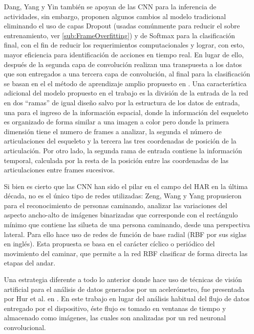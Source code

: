        Dang, Yang y Yin \cite{Dang2020Har3dSkelleton} también se apoyan de las CNN para la inferencia de actividades, sin embargo, proponen algunos cambios al modelo tradicional eliminando el uso de capas Dropout (usadas comúnmente para reducir el sobre entrenamiento, ver \ref{sub:FrameOverfitting}) y de Softmax para la clasificación final, con el fin de reducir los requerimientos computacionales y lograr, con esto, mayor eficiencia para identificación de acciones en tiempo real. En lugar de ello, después de la segunda capa de convolución realizan una transpuesta a los datos que son entregados a una tercera capa de convolución, al final para la clasificación se basan en el el método de aprendizaje amplio propuesto en \cite{Chen2018Bls}. Una característica adicional del modelo propuesto en el trabajo \cite{Dang2020Har3dSkelleton} es la división de la entrada de la red en dos ``ramas'' de igual diseño salvo por la estructura de los datos de entrada, una para el ingreso de la información espacial, donde la información del esqueleto es organizado de forma similar a una imagen a color pero donde la primera dimensión tiene el numero de frames a analizar, la segunda el número de articulaciones del esqueleto y la tercera las tres coordenadas de posición de la articulación. Por otro lado, la segunda rama de entrada contiene la información temporal, calculada por la resta de la posición entre las coordenadas de las articulaciones entre frames sucesivos.
        
        Si bien es cierto que las CNN han sido el pilar en el campo del HAR en la última década, no es el único tipo de redes utilizadas: Zeng, Wang y Yang \cite{Zeng2014} propusieron para el reconocimiento de personas caminando, analizar las variaciones del aspecto ancho-alto de imágenes binarizadas que corresponde con el rectángulo mínimo que contiene las silueta de una persona caminando, desde una perspectiva lateral. Para ello hace uso de redes de función de base radial (RBF por sus siglas en inglés). Esta propuesta se basa en el carácter cíclico o periódico del movimiento del caminar, que permite a la red RBF clasificar de forma directa las etapas del andar.
        
        Una estrategia diferente a todo lo anterior donde hace uso de técnicas de visión artificial para el análisis de datos generados por un acelerómetro, fue presentada por Hur et al. en  \cite{Hur2018AcelerometerCNN}. En este trabajo en lugar del análisis habitual del flujo de datos entregado por el dispositivo, éste flujo es tomado en ventanas de tiempo y almacenado como imágenes, las cuales son analizadas por un red neuronal convolucional.
        
